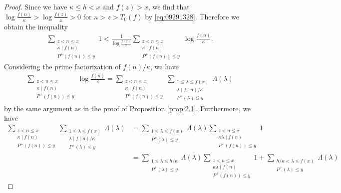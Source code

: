 \documentclass[a4paper,11pt]{amsart}
\theoremstyle{definition}
\numberwithin{equation}{section}
\begin{document}
\begin{proof}
Since we have $\kappa \leq h<x$ and $f(z)>x$, we find that $\log{\frac{f(n)}{\kappa}}>\log{\frac{f(z)}{x}}>0$ for $n>z>T_0(f)$ by \eqref{eq:09291328}. 
Therefore we obtain the inequality
\begin{align*}
\sum_{\substack{z<n \leq x \\ \kappa \mid f(n) \\ P^+(f(n)) \leq y}} 1
< \frac{1}{\log{\frac{f(z)}{x}}}
\sum_{\substack{z<n \leq x \\ \kappa \mid f(n) \\ P^+(f(n)) \leq y}} \log{\frac{f(n)}{\kappa}}. 
\end{align*}
Considering the prime factorization of $f(n)/\kappa$, we have
\begin{align*}
\sum_{\substack{z<n \leq x \\ \kappa \mid f(n) \\ P^+(f(n)) \leq y}} \log{\frac{f(n)}{\kappa}}
= \sum_{\substack{z<n \leq x \\ \kappa \mid f(n) \\ P^+(f(n)) \leq y}} 
\sum_{\substack{1 \leq \lambda \leq f(x) \\ \lambda \mid f(n)/\kappa \\ P^+(\lambda) \leq y}} \Lambda(\lambda)
\end{align*}
by the same argument as in the proof of Proposition \ref{prop:2.1}. 
Furthermore, we have
\begin{align*}
\sum_{\substack{z<n \leq x \\ \kappa \mid f(n) \\ P^+(f(n)) \leq y}} 
\sum_{\substack{1 \leq \lambda \leq f(x) \\ \lambda \mid f(n)/\kappa \\ P^+(\lambda) \leq y}} \Lambda(\lambda)
&= \sum_{\substack{1 \leq \lambda \leq f(x) \\ P^+(\lambda) \leq y}} \Lambda(\lambda)
\sum_{\substack{z<n \leq x \\ \kappa \lambda \mid f(n) \\ P^+(f(n)) \leq y}}  1 \\
&= \sum_{\substack{1 \leq \lambda \leq h/\kappa \\ P^+(\lambda) \leq y}} \Lambda(\lambda)
\sum_{\substack{z<n \leq x \\ \kappa \lambda \mid f(n) \\ P^+(f(n)) \leq y}}  1 
+ \sum_{\substack{h/\kappa < \lambda \leq f(x) \\ P^+(\lambda) \leq y}} \Lambda(\lambda)

\end{align*}
\end{proof}
\end{document}
